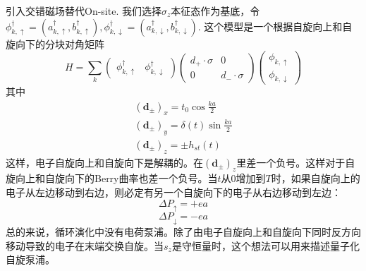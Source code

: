 \documentclass{article}
\numberwithin{equation}{subsection}
\begin{document}
引入交错磁场替代On-site. 我们选择$\sigma_z$本征态作为基底，令$\phi_{k,\uparrow}^\dagger=(a_{k,\uparrow}^\dagger,b_{k,\uparrow}^\dagger),\phi_{k,\downarrow}^\dagger=(a_{k,\downarrow}^\dagger,b_{k,\downarrow}^\dagger)$. 这个模型是一个根据自旋向上和自旋向下的分块对角矩阵
\begin{equation}
    H=\sum_{k}\begin{pmatrix}
        \phi_{k,\uparrow}^\dagger&\phi_{k,\downarrow}^\dagger
    \end{pmatrix}\begin{pmatrix}
        d_+\cdot\sigma&0\\
        0&d_{-}\cdot\sigma
    \end{pmatrix}\begin{pmatrix}
        \phi_{k,\uparrow}\\
        \phi_{k,\downarrow}
    \end{pmatrix}
\end{equation}
其中
\begin{equation}
    \begin{array}{l}
        \left(\mathbf{d}_{\pm}\right)_{x}=t_0\cos\frac{ka}{2} \\
        \left(\mathbf{d}_{\pm}\right)_{y}=\delta(t) \sin \frac{ka}{2}\\
        \left(\mathbf{d}_{\pm}\right)_{z}=\pm h_{s t}(t)
        \end{array}
\end{equation}
这样，电子自旋向上和自旋向下是解耦的。在$(\mathbf{d}_{\pm})_z$里差一个负号。这样对于自旋向上和自旋向下的Berry曲率也差一个负号。当$t$从$0$增加到$T$时，如果自旋向上的电子从左边移动到右边，则必定有另一个自旋向下的电子从右边移动到左边：
\begin{equation}
    \Delta P_{\uparrow}=+ea
\end{equation}
\begin{equation}
    \Delta P_{\downarrow}=-ea
\end{equation}
总的来说，循环演化中没有电荷泵浦。除了由电子自旋向上和自旋向下同时反方向移动导致的电子在末端交换自旋。当$s_z$是守恒量时，这个想法可以用来描述量子化自旋泵浦。
\end{document}
